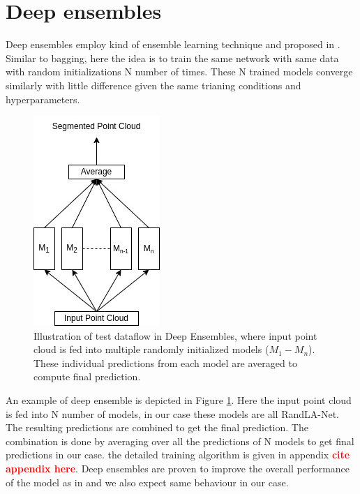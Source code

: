 \section{Deep ensembles}
\label{sec:meth_deepensembles}
Deep ensembles employ kind of ensemble learning technique and proposed in \cite{lakshminarayanan2016simple}.
Similar to bagging, here the idea is to train the same network with same data with random initializations N number of times.
These N trained models converge similarly with little difference given the same trianing conditions and hyperparameters.
\begin{figure}
    \centering
    \includegraphics[scale=0.55]{images/DE.jpg}
    \caption{Illustration of test dataflow in Deep Ensembles, where input point cloud is fed into multiple randomly initialized models ($M_1-M_n$). 
    These individual predictions from each model are averaged to compute final prediction.}
    \label{fig:deepensembles}
\end{figure}
An example of deep ensemble is depicted in Figure \ref{fig:deepensembles}.
Here the input point cloud is fed into N number of models, in our case these models are all RandLA-Net.
The resulting predictions are combined to get the final prediction. 
The combination is done by averaging over all the predictions of N models to get final predictions in our case.
the detailed training algorithm is given in appendix \textcolor{red}{\textbf{cite appendix here}}.
Deep ensembles are proven to improve the overall performance of the model as in \cite{bhandary2020evaluating} and we also expect same behaviour in our case.

